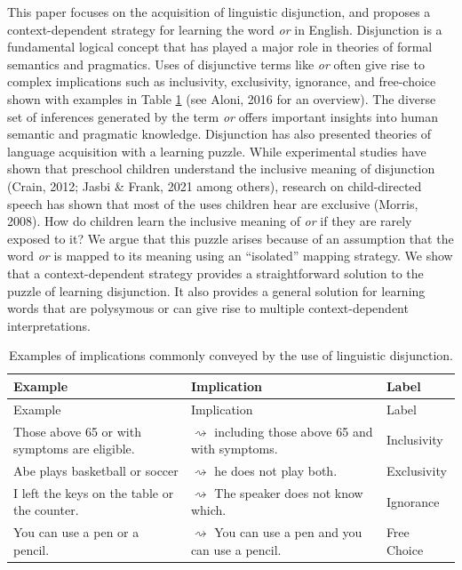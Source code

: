 \documentclass[
  english,
  ,man,floatsintext]{apa6}
\begin{document}
This paper focuses on the acquisition of linguistic disjunction, and proposes a context-dependent strategy for learning the word \emph{or} in English. Disjunction is a fundamental logical concept that has played a major role in theories of formal semantics and pragmatics. Uses of disjunctive terms like \emph{or} often give rise to complex implications such as inclusivity, exclusivity, ignorance, and free-choice shown with examples in Table \ref{tab:orexamples} (see Aloni, 2016 for an overview). The diverse set of inferences generated by the term \emph{or} offers important insights into human semantic and pragmatic knowledge. Disjunction has also presented theories of language acquisition with a learning puzzle. While experimental studies have shown that preschool children understand the inclusive meaning of disjunction (Crain, 2012; Jasbi \& Frank, 2021 among others), research on child-directed speech has shown that most of the uses children hear are exclusive (Morris, 2008). How do children learn the inclusive meaning of \emph{or} if they are rarely exposed to it? We argue that this puzzle arises because of an assumption that the word \emph{or} is mapped to its meaning using an ``isolated'' mapping strategy. We show that a context-dependent strategy provides a straightforward solution to the puzzle of learning disjunction. It also provides a general solution for learning words that are polysymous or can give rise to multiple context-dependent interpretations.

\begin{longtable}[]{@{}
  >{\raggedright\arraybackslash}p{}
  >{\raggedright\arraybackslash}p{}
  >{\raggedright\arraybackslash}p{}@{}}
\caption{\label{tab:orexamples} Examples of implications commonly conveyed by the use of linguistic disjunction.}\tabularnewline
\toprule
Example & Implication & Label \\
\midrule
\endfirsthead
\toprule
Example & Implication & Label \\
\midrule
\endhead
Those above 65 or with symptoms are eligible. & \(\rightsquigarrow\) including those above 65 and with symptoms. & Inclusivity \\
Abe plays basketball or soccer & \(\rightsquigarrow\) he does not play both. & Exclusivity \\
I left the keys on the table or the counter. & \(\rightsquigarrow\) The speaker does not know which. & Ignorance \\
You can use a pen or a pencil. & \(\rightsquigarrow\) You can use a pen and you can use a pencil. & Free Choice \\
\bottomrule
\end{longtable}
\end{document}

